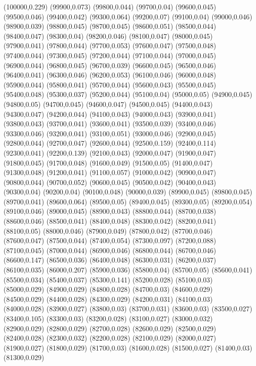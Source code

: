 (100000,0.229)
(99900,0.073)
(99800,0.044)
(99700,0.04)
(99600,0.045)
(99500,0.046)
(99400,0.042)
(99300,0.064)
(99200,0.07)
(99100,0.04)
(99000,0.046)
(98900,0.039)
(98800,0.045)
(98700,0.045)
(98600,0.051)
(98500,0.044)
(98400,0.047)
(98300,0.04)
(98200,0.046)
(98100,0.047)
(98000,0.045)
(97900,0.041)
(97800,0.044)
(97700,0.053)
(97600,0.047)
(97500,0.048)
(97400,0.044)
(97300,0.045)
(97200,0.044)
(97100,0.044)
(97000,0.045)
(96900,0.044)
(96800,0.045)
(96700,0.039)
(96600,0.045)
(96500,0.046)
(96400,0.041)
(96300,0.046)
(96200,0.053)
(96100,0.046)
(96000,0.048)
(95900,0.044)
(95800,0.041)
(95700,0.044)
(95600,0.043)
(95500,0.045)
(95400,0.048)
(95300,0.037)
(95200,0.044)
(95100,0.04)
(95000,0.05)
(94900,0.045)
(94800,0.05)
(94700,0.045)
(94600,0.047)
(94500,0.045)
(94400,0.043)
(94300,0.047)
(94200,0.044)
(94100,0.043)
(94000,0.043)
(93900,0.041)
(93800,0.043)
(93700,0.041)
(93600,0.041)
(93500,0.039)
(93400,0.046)
(93300,0.046)
(93200,0.041)
(93100,0.051)
(93000,0.046)
(92900,0.045)
(92800,0.044)
(92700,0.047)
(92600,0.044)
(92500,0.159)
(92400,0.114)
(92300,0.041)
(92200,0.139)
(92100,0.043)
(92000,0.047)
(91900,0.047)
(91800,0.045)
(91700,0.048)
(91600,0.049)
(91500,0.05)
(91400,0.047)
(91300,0.048)
(91200,0.041)
(91100,0.057)
(91000,0.042)
(90900,0.047)
(90800,0.044)
(90700,0.052)
(90600,0.045)
(90500,0.042)
(90400,0.043)
(90300,0.04)
(90200,0.04)
(90100,0.048)
(90000,0.039)
(89900,0.045)
(89800,0.045)
(89700,0.041)
(89600,0.064)
(89500,0.05)
(89400,0.045)
(89300,0.05)
(89200,0.054)
(89100,0.046)
(89000,0.045)
(88900,0.043)
(88800,0.044)
(88700,0.038)
(88600,0.046)
(88500,0.041)
(88400,0.048)
(88300,0.042)
(88200,0.041)
(88100,0.05)
(88000,0.046)
(87900,0.049)
(87800,0.042)
(87700,0.046)
(87600,0.047)
(87500,0.044)
(87400,0.054)
(87300,0.097)
(87200,0.088)
(87100,0.045)
(87000,0.044)
(86900,0.046)
(86800,0.044)
(86700,0.046)
(86600,0.147)
(86500,0.036)
(86400,0.048)
(86300,0.031)
(86200,0.037)
(86100,0.035)
(86000,0.207)
(85900,0.036)
(85800,0.04)
(85700,0.05)
(85600,0.041)
(85500,0.034)
(85400,0.037)
(85300,0.141)
(85200,0.028)
(85100,0.03)
(85000,0.029)
(84900,0.029)
(84800,0.028)
(84700,0.03)
(84600,0.029)
(84500,0.029)
(84400,0.028)
(84300,0.029)
(84200,0.031)
(84100,0.03)
(84000,0.028)
(83900,0.027)
(83800,0.03)
(83700,0.031)
(83600,0.03)
(83500,0.027)
(83400,0.105)
(83300,0.03)
(83200,0.028)
(83100,0.027)
(83000,0.032)
(82900,0.029)
(82800,0.029)
(82700,0.028)
(82600,0.029)
(82500,0.029)
(82400,0.028)
(82300,0.032)
(82200,0.028)
(82100,0.029)
(82000,0.027)
(81900,0.027)
(81800,0.029)
(81700,0.03)
(81600,0.028)
(81500,0.027)
(81400,0.03)
(81300,0.029)

